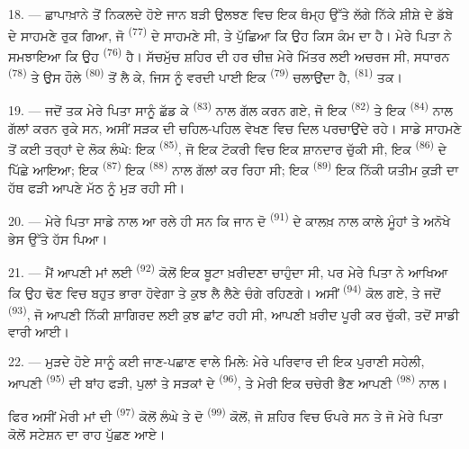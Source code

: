 \VUsaut{3.0mm}

18. --- ਛਾਪਾਖ਼ਾਨੇ ਤੋਂ ਨਿਕਲਦੇ ਹੋਏ ਜਾਨ ਬੜੀ ਉਲਝਣ ਵਿਚ ਇਕ ਥੰਮ੍ਹ ਉੱਤੇ ਲੱਗੇ ਨਿੱਕੇ ਸ਼ੀਸ਼ੇ
ਦੇ ਡੱਬੇ ਦੇ ਸਾਹਮਣੇ ਰੁਕ ਗਿਆ, ਜੋ  \textsuperscript{(77)} ਦੇ
ਸਾਹਮਣੇ ਸੀ, ਤੇ ਪੁੱਛਿਆ ਕਿ ਉਹ ਕਿਸ ਕੰਮ ਦਾ ਹੈ। ਮੇਰੇ ਪਿਤਾ ਨੇ ਸਮਝਾਇਆ ਕਿ ਉਹ
 \textsuperscript{(76)} ਹੈ। ਸੱਚਮੁੱਚ ਸ਼ਹਿਰ ਦੀ ਹਰ ਚੀਜ਼ ਮੇਰੇ ਮਿੱਤਰ
ਲਈ ਅਚਰਜ ਸੀ, ਸਧਾਰਨ  \textsuperscript{(78)} ਤੇ ਉਸ ਹੌਲੇ
 \textsuperscript{(80)} ਤੋਂ ਲੈ ਕੇ, ਜਿਸ ਨੂੰ ਵਰਦੀ ਪਾਈ ਇਕ
 \textsuperscript{(79)} ਚਲਾਉਂਦਾ ਹੈ, 
\textsuperscript{(81)} ਤਕ।

19. --- ਜਦੋਂ ਤਕ ਮੇਰੇ ਪਿਤਾ ਸਾਨੂੰ ਛੱਡ ਕੇ 
\textsuperscript{(83)} ਨਾਲ ਗੱਲ ਕਰਨ ਗਏ, ਜੋ ਇਕ  \textsuperscript{(82)}
ਤੇ ਇਕ  \textsuperscript{(84)} ਨਾਲ ਗੱਲਾਂ ਕਰਨ ਰੁਕੇ ਸਨ, ਅਸੀਂ ਸੜਕ ਦੀ
ਚਹਿਲ-ਪਹਿਲ ਵੇਖਣ ਵਿਚ ਦਿਲ ਪਰਚਾਉਂਦੇ ਰਹੇ। ਸਾਡੇ ਸਾਹਮਣੇ ਤੋਂ ਕਈ ਤਰ੍ਹਾਂ ਦੇ ਲੋਕ ਲੰਘੇ: ਇਕ
 \textsuperscript{(85)}, ਜੋ ਇਕ ਟੋਕਰੀ ਵਿਚ ਇਕ ਸ਼ਾਨਦਾਰ
 ਚੁੱਕੀ ਸੀ, ਇਕ  \textsuperscript{(86)} ਦੇ
ਪਿੱਛੇ ਆਇਆ; ਇਕ  \textsuperscript{(87)} ਇਕ
 \textsuperscript{(88)} ਨਾਲ ਗੱਲਾਂ ਕਰ ਰਿਹਾ ਸੀ; ਇਕ
 \textsuperscript{(89)} ਇਕ ਨਿੱਕੀ ਯਤੀਮ ਕੁੜੀ ਦਾ ਹੱਥ ਫੜੀ ਆਪਣੇ ਮੱਠ ਨੂੰ ਮੁੜ
ਰਹੀ ਸੀ।

\VUsaut{3.0mm}

20. --- ਮੇਰੇ ਪਿਤਾ ਸਾਡੇ ਨਾਲ ਆ ਰਲੇ ਹੀ ਸਨ ਕਿ ਜਾਨ ਦੋ 
\textsuperscript{(91)} ਦੇ ਕਾਲਖ਼ ਨਾਲ ਕਾਲੇ ਮੂੰਹਾਂ ਤੇ ਅਨੋਖੇ ਭੇਸ ਉੱਤੇ ਹੱਸ ਪਿਆ।

21. --- ਮੈਂ ਆਪਣੀ ਮਾਂ ਲਈ  \textsuperscript{(92)} ਕੋਲੋਂ ਇਕ
ਬੂਟਾ ਖ਼ਰੀਦਣਾ ਚਾਹੁੰਦਾ ਸੀ, ਪਰ ਮੇਰੇ ਪਿਤਾ ਨੇ ਆਖਿਆ ਕਿ ਉਹ ਢੋਣ ਵਿਚ ਬਹੁਤ ਭਾਰਾ ਹੋਵੇਗਾ ਤੇ
ਕੁਝ  ਲੈ ਲੈਣੇ ਚੰਗੇ ਰਹਿਣਗੇ। ਅਸੀਂ 
\textsuperscript{(94)} ਕੋਲ ਗਏ, ਤੇ ਜਦੋਂ  \textsuperscript{(93)}, ਜੋ
ਆਪਣੀ ਨਿੱਕੀ ਸ਼ਾਗਿਰਦ ਲਈ ਕੁਝ ਛਾਂਟ ਰਹੀ ਸੀ, ਆਪਣੀ ਖ਼ਰੀਦ ਪੂਰੀ ਕਰ ਚੁੱਕੀ, ਤਦੋਂ ਸਾਡੀ ਵਾਰੀ
ਆਈ।

22. --- ਮੁੜਦੇ ਹੋਏ ਸਾਨੂੰ ਕਈ ਜਾਣ-ਪਛਾਣ ਵਾਲੇ ਮਿਲੇ: ਮੇਰੇ ਪਰਿਵਾਰ ਦੀ ਇਕ ਪੁਰਾਣੀ ਸਹੇਲੀ,
ਆਪਣੀ  \textsuperscript{(95)} ਦੀ ਬਾਂਹ ਫੜੀ, ਪੁਲਾਂ ਤੇ ਸੜਕਾਂ ਦੇ
 \textsuperscript{(96)}, ਤੇ ਮੇਰੀ ਇਕ ਚਚੇਰੀ ਭੈਣ ਆਪਣੀ 
\textsuperscript{(98)} ਨਾਲ।

ਫਿਰ ਅਸੀਂ ਮੇਰੀ ਮਾਂ ਦੀ  \textsuperscript{(97)} ਕੋਲੋਂ ਲੰਘੇ
ਤੇ ਦੋ  \textsuperscript{(99)} ਕੋਲੋਂ, ਜੋ ਸ਼ਹਿਰ ਵਿਚ ਓਪਰੇ ਸਨ ਤੇ ਜੋ ਮੇਰੇ
ਪਿਤਾ ਕੋਲੋਂ ਸਟੇਸ਼ਨ ਦਾ ਰਾਹ ਪੁੱਛਣ ਆਏ।
\VUsaut{6.0mm}
\VUfilet{22mm}
